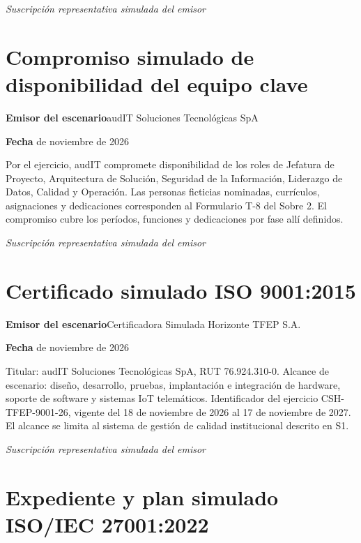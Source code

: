 \medskip
\noindent\textit{Suscripción representativa simulada del emisor}\par
\label{adm:nube-fin}

\clearpage
\section*{Compromiso simulado de disponibilidad del equipo clave}\label{adm:equipo}

\rotuloSimuladoSobreUno
\noindent\textbf{Emisor del escenario}\enspace audIT Soluciones Tecnológicas SpA\par
\noindent\textbf{Fecha} de noviembre de 2026\par
\medskip

Por el ejercicio, audIT compromete disponibilidad de los roles de Jefatura de Proyecto, Arquitectura de Solución, Seguridad de la Información, Liderazgo de Datos, Calidad y Operación. Las personas ficticias nominadas, currículos, asignaciones y dedicaciones corresponden al Formulario T-8 del Sobre 2. El compromiso cubre los períodos, funciones y dedicaciones por fase allí definidos.

\medskip
\noindent\textit{Suscripción representativa simulada del emisor}\par
\label{adm:equipo-fin}

\clearpage
\section*{Certificado simulado ISO 9001:2015}\label{adm:iso9001}

\rotuloSimuladoSobreUno
\noindent\textbf{Emisor del escenario}\enspace Certificadora Simulada Horizonte TFEP S.A.\par
\noindent\textbf{Fecha} de noviembre de 2026\par
\medskip

Titular: audIT Soluciones Tecnológicas SpA, RUT 76.924.310-0. Alcance de escenario: diseño, desarrollo, pruebas, implantación e integración de hardware, soporte de software y sistemas IoT telemáticos. Identificador del ejercicio CSH-TFEP-9001-26, vigente del 18 de noviembre de 2026 al 17 de noviembre de 2027. El alcance se limita al sistema de gestión de calidad institucional descrito en S1.

\medskip
\noindent\textit{Suscripción representativa simulada del emisor}\par
\label{adm:iso9001-fin}

\clearpage
\section*{Expediente y plan simulado ISO/IEC 27001:2022}\label{adm:iso27001}

